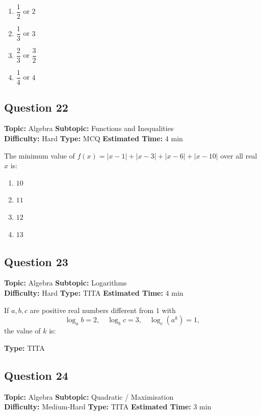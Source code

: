 \documentclass[11pt]{article}
\begin{document}
\begin{enumerate}[label=(\Alph*)]
    \item \(\dfrac{1}{2}\) or \(2\)
    \item \(\dfrac{1}{3}\) or \(3\)
    \item \(\dfrac{2}{3}\) or \(\dfrac{3}{2}\)
    \item \(\dfrac{1}{4}\) or \(4\)
\end{enumerate}

\subsection*{Question 22}
\textbf{Topic:} Algebra \quad \textbf{Subtopic:} Functions and Inequalities \\
\textbf{Difficulty:} Hard \quad \textbf{Type:} MCQ \quad \textbf{Estimated Time:} 4 min

\begin{tcolorbox}
The minimum value of \(f(x) = |x-1| + |x-3| + |x-6| + |x-10|\) over all real \(x\) is:
\end{tcolorbox}

\begin{enumerate}[label=(\Alph*)]
    \item \(10\)
    \item \(11\)
    \item \(12\)
    \item \(13\)
\end{enumerate}

\subsection*{Question 23}
\textbf{Topic:} Algebra \quad \textbf{Subtopic:} Logarithms \\
\textbf{Difficulty:} Hard \quad \textbf{Type:} TITA \quad \textbf{Estimated Time:} 4 min

\begin{tcolorbox}
If \(a, b, c\) are positive real numbers different from \(1\) with
\[
\log_{a} b = 2, \quad \log_{b} c = 3, \quad \log_{c} (a^k) = 1,
\]
the value of \(k\) is:
\end{tcolorbox}

\textbf{Type:} TITA

\subsection*{Question 24}
\textbf{Topic:} Algebra \quad \textbf{Subtopic:} Quadratic / Maximisation \\
\textbf{Difficulty:} Medium-Hard \quad \textbf{Type:} TITA \quad \textbf{Estimated Time:} 3 min
\end{document}
